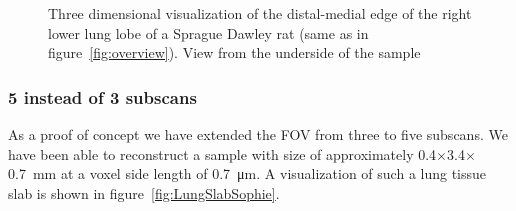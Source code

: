 \begin{figure}
{%
		}%
	\caption{Three dimensional visualization of the distal-medial edge of the right lower lung lobe of a Sprague Dawley rat (same as in figure~\ref{fig:overview}). View from the underside of the sample}
	\label{fig:down}
\end{figure}


\subsubsection{5 instead of 3 subscans}
As a proof of concept we have extended the FOV from three to five subscans. We have been able to reconstruct a sample with size of approximately 0.4$\times$3.4$\times$\SI{0.7}{\milli\meter} at a voxel side length of \SI{0.7}{\micro\meter}. A visualization of such a lung tissue slab is shown in figure~\ref{fig:LungSlabSophie}.

